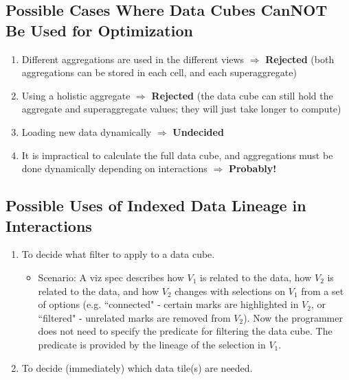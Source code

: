 \subsection{Possible Cases Where Data Cubes CanNOT Be Used for Optimization}
\begin{enumerate}
	\item Different aggregations are used in the different views $\Rightarrow$ \textbf{Rejected} (both aggregations can be stored in each cell, and each superaggregate)
	\item Using a holistic aggregate $\Rightarrow$ \textbf{Rejected} (the data cube can still hold the aggregate and superaggregate values; they will just take longer to compute)
	\item Loading new data dynamically $\Rightarrow$ \textbf{Undecided}
	\item It is impractical to calculate the full data cube, and aggregations must be done dynamically depending on interactions $\Rightarrow$ \textbf{Probably!}
\end{enumerate}
\subsection{Possible Uses of Indexed Data Lineage in Interactions}
\begin{enumerate}
	\item To decide what filter to apply to a data cube.
		\begin{itemize}
			\item Scenario: A viz spec describes how $V_1$ is related to the data, how $V_2$ is related to the data, and how $V_2$ changes with selections on $V_1$ from a set of options (e.g. ``connected" - certain marks are highlighted in $V_2$, or ``filtered" - unrelated marks are removed from $V_2$).
			Now the programmer does not need to specify the predicate for filtering the data cube.
			The predicate is provided by the lineage of the selection in $V_1$.
		\end{itemize}
	\item To decide (immediately) which data tile(s) are needed.
\end{enumerate}